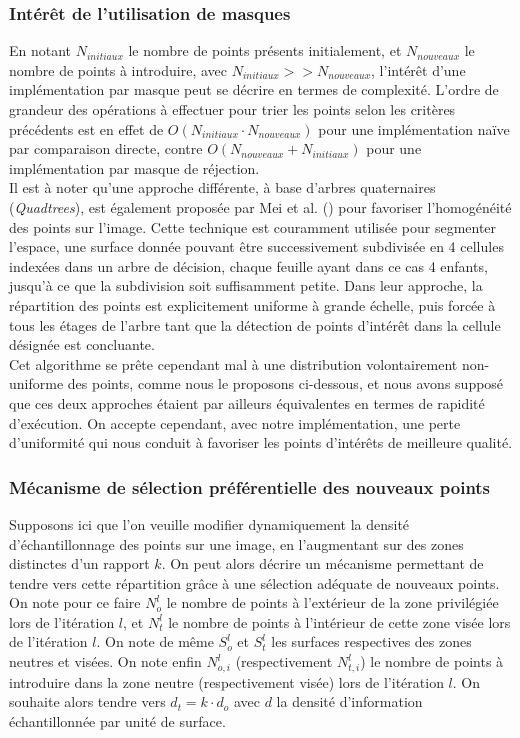 \subsubsection{Intérêt de l'utilisation de masques}
En notant $N_{initiaux}$ le nombre de points présents initialement, et $N_{nouveaux}$ le nombre de points à introduire, avec $N_{initiaux} >> N_{nouveaux}$, l'intérêt d'une implémentation par masque peut se décrire en termes de complexité. L'ordre de grandeur des opérations à effectuer pour trier les points selon les critères précédents est en effet de $O(N_{initiaux} \cdot N_{nouveaux})$ pour une implémentation naïve par comparaison directe, contre $O(N_{nouveaux} + N_{initiaux})$ pour une implémentation par masque de réjection.\\

Il est à noter qu'une approche différente, à base d'arbres quaternaires (\emph{Quadtrees}), est également proposée par Mei et al. (\cite{Mei2010, Mei}) pour favoriser l'homogénéité des points sur l'image. Cette technique est couramment utilisée pour segmenter l'espace, une surface donnée pouvant être successivement subdivisée en 4 cellules indexées dans un arbre de décision, chaque feuille ayant dans ce cas 4 enfants, jusqu'à ce que la subdivision soit suffisamment petite. Dans leur approche, la répartition des points est explicitement uniforme à grande échelle, puis forcée à tous les étages de l'arbre tant que la détection de points d'intérêt dans la cellule désignée est concluante. \\
Cet algorithme se prête cependant mal à une distribution volontairement non-uniforme des points, comme nous le proposons ci-dessous, et nous avons supposé que ces deux approches étaient par ailleurs équivalentes en termes de rapidité d'exécution. On accepte cependant, avec notre implémentation, une perte d'uniformité qui nous conduit à favoriser les points d'intérêts de meilleure qualité.

\subsubsection{Mécanisme de sélection préférentielle des nouveaux points} \label{sec:ch3_Sélection dynamique des points d'intérêt}
Supposons ici que l'on veuille modifier dynamiquement la densité d'échantillonnage des points sur une image, en l'augmentant sur des zones distinctes d'un rapport $k$. On peut alors décrire un mécanisme permettant de tendre vers cette répartition grâce à une sélection adéquate de nouveaux points. On note pour ce faire $N_o^l$ le nombre de points à l'extérieur de la zone privilégiée lors de l'itération $l$, et $N_t^l$ le nombre de points à l'intérieur de cette zone visée lors de l'itération $l$. On note de même $S_o^l$ et $S_t^l$ les surfaces respectives des zones neutres et visées. On note enfin  $N_{o,i}^l$ (respectivement $N_{t,i}^l$) le nombre de points à introduire dans la zone neutre (respectivement visée) lors de l'itération $l$. On souhaite alors tendre vers $d_t = k \cdot d_o$ avec $d$ la densité d'information échantillonnée par unité de surface. 

